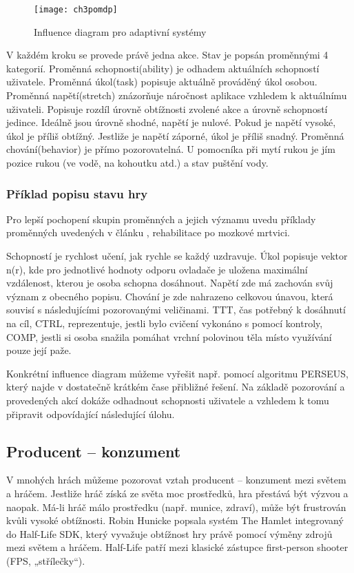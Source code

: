 \begin{figure}
  \centering
  \texttt{[image: ch3pomdp]}
	\caption{Influence diagram pro adaptivní systémy}
	\label{fig:ch3pomdp}
\end{figure}

V každém kroku se provede právě jedna akce. Stav je popsán proměnnými 4 kategorií. Proměnná schopnosti(ability) je odhadem aktuálních schopností uživatele. Proměnná úkol(task) popisuje aktuálně prováděný úkol osobou. Proměnná napětí(stretch) znázorňuje náročnost aplikace vzhledem k aktuálnímu uživateli. Popisuje rozdíl úrovně obtížnosti zvolené akce a úrovně schopností jedince. Ideálně jsou úrovně shodné, napětí je nulové. Pokud je napětí vysoké, úkol je příliš obtížný. Jestliže je napětí záporné, úkol je příliš snadný. Proměnná chování(behavior) je přímo pozorovatelná. U pomocníka při mytí rukou je jím pozice rukou (ve vodě, na kohoutku atd.) a stav puštění vody.

\subsubsection{Příklad popisu stavu hry}

Pro lepší pochopení skupin proměnných a jejich významu uvedu příklady proměnných uvedených v článku \cite{9Pomdp}, rehabilitace po mozkové mrtvici.

Schopností je rychlost učení, jak rychle se každý uzdravuje. Úkol popisuje vektor n(r), kde pro jednotlivé hodnoty odporu ovladače je uložena maximální vzdálenost, kterou je osoba schopna dosáhnout. Napětí zde má zachován svůj význam z obecného popisu. Chování je zde nahrazeno celkovou únavou, která souvisí s následujícími pozorovanými veličinami. TTT, čas potřebný k dosáhnutí na cíl, CTRL, reprezentuje, jestli bylo cvičení vykonáno s pomocí kontroly, COMP, jestli si osoba snažila pomáhat vrchní polovinou těla místo využívání pouze její paže.

Konkrétní influence diagram můžeme vyřešit např. pomocí algoritmu PERSEUS, který najde v dostatečně krátkém čase přibližné řešení. Na základě pozorování a provedených akcí dokáže odhadnout schopnosti uživatele a vzhledem k tomu připravit odpovídající následující úlohu.

\subsection{Producent – konzument}

V mnohých hrách můžeme pozorovat vztah producent – konzument mezi světem a hráčem. Jestliže hráč získá ze světa moc prostředků, hra přestává být výzvou a naopak. Má-li hráč málo prostředku (např. munice, zdraví), může být frustrován kvůli vysoké obtížnosti.
Robin Hunicke popsala systém The Hamlet integrovaný do Half-Life SDK\cite{20Hun}, který vyvažuje obtížnost hry právě pomocí výměny zdrojů mezi světem a hráčem. Half-Life patří mezi klasické zástupce first-person shooter (FPS, „střílečky“).

